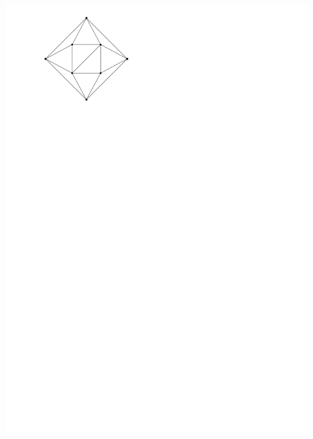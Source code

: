 \documentclass[a4paper]{article}
\begin{document}
\includegraphics[scale=.3]{./introduction/img/caCa.pdf}
\clearpage%
\end{document}
